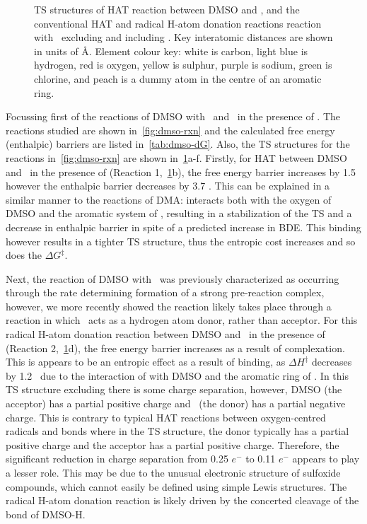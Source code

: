 \begin{figure}[!htbp]
\caption[TS structures of HAT reaction between DMSO and \cumo, and the
conventional HAT and radical H-atom donation reactions with \bno\ excluding and
including .]{TS structures of HAT reaction between DMSO and \cumo, and
the conventional HAT and radical H-atom donation reactions reaction with \bno\
excluding and including . Key interatomic distances are shown in units
of \AA. Element colour key: white is carbon, light blue is hydrogen, red is
oxygen, yellow is sulphur, purple is sodium, green is chlorine, and peach is a
dummy atom in the centre of an aromatic ring.}
\label{fig:dmso-ts}
\end{figure}

Focussing first of the reactions of DMSO with \cumo\ and \bno\ in the presence
of \ch{NaCl}. The reactions studied are shown in~\ref{fig:dmso-rxn} and the
calculated free energy (enthalpic) barriers are listed in~\ref{tab:dmso-dG}.
Also, the TS structures for the reactions in~\ref{fig:dmso-rxn} are shown
in~\ref{fig:dmso-ts}a-f. Firstly, for HAT between DMSO and \cumo\ in the
presence of \ch{NaCl} (Reaction 1,~\ref{fig:dmso-ts}b), the free energy barrier
increases by 1.5 \kcalmol\, however the enthalpic barrier decreases by 3.7
\kcalmol. This can be explained in a similar manner to the reactions of DMA:
\ch{Na^+} interacts both with the oxygen of DMSO and the aromatic system of
\cumo, resulting in a stabilization of the TS and a decrease in enthalpic
barrier in spite of a predicted increase in \ch{C-H} BDE. This binding however
results in a tighter TS structure, thus the entropic cost increases and so does
the $\Delta G^\ddagger$.

Next, the reaction of DMSO with \bno\ was previously
characterized\cite{Salamone2012} as occurring through the rate determining
formation of a strong pre-reaction complex, however, we more recently showed the
reaction likely takes place through a reaction in which \bno\ acts as a hydrogen
atom donor, rather than acceptor.\cite{vanSanten2016} For this radical H-atom
donation reaction between DMSO and \bno\ in the presence of  (Reaction
2,~\ref{fig:dmso-ts}d), the free energy barrier increases as a result of
\ch{NaCl} complexation. This is appears to be an entropic effect as a result of
binding, as $\Delta H^\ddagger$ decreases by 1.2 \kcalmol\ due to the
interaction of \ch{Na} with DMSO and the aromatic ring of \bno. In this TS
structure excluding \ch{NaCl} there is some charge separation, however, DMSO
(the acceptor) has a partial positive charge and \bno\ (the donor) has a partial
negative charge. This is contrary to typical HAT reactions between
oxygen-centred radicals and \ch{C-H} bonds where in the TS structure, the donor
typically has a partial positive charge and the acceptor has a partial positive
charge. Therefore, the significant reduction in charge separation from 0.25
$e^-$ to 0.11 $e^-$ appears to play a lesser role. This may be due to the
unusual electronic structure of sulfoxide compounds, which cannot easily be
defined using simple Lewis structures. The radical H-atom donation reaction is
likely driven by the concerted cleavage of the \ch{S=O} bond of DMSO-H.

